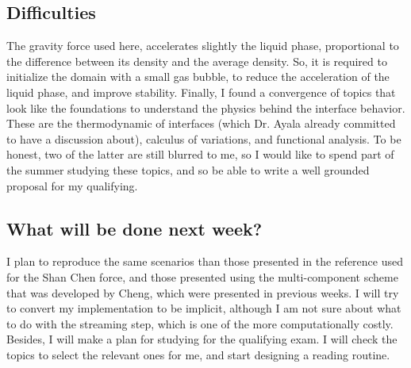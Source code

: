 \documentclass[12pt]{article}
\begin{document}
	\subsection*{Difficulties}
	The gravity force used here, accelerates slightly the liquid phase, proportional to the difference between its density and the average density. So, it is required to initialize the domain with a small gas bubble, to reduce the acceleration of the liquid phase, and improve stability. Finally, I found a convergence of topics that look like the foundations to understand the physics behind the interface behavior. These are the thermodynamic of interfaces (which Dr. Ayala already committed to have a discussion about), calculus of variations, and functional analysis. To be honest, two of the latter are still blurred to me, so I would like to spend part of the summer studying these topics, and so be able to write a well grounded proposal for my qualifying.
	
	\subsection*{What will be done next week?}
	I plan to reproduce the same scenarios than those presented in the reference used for the Shan Chen force, and those presented using the multi-component scheme that was developed by Cheng, which were presented in previous weeks. I will try to convert my implementation to be implicit, although I am not sure about what to do with the streaming step, which is one of the more computationally costly. Besides, I will make a plan for studying for the qualifying exam. I will check the topics to select the relevant ones for me, and start designing a reading routine. 
	
	\printbibliography %
\end{document}
